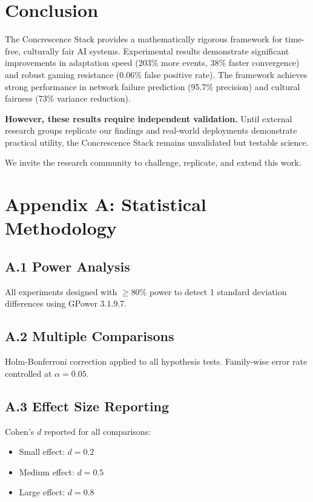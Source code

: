 \documentclass[11pt]{article}
\begin{document}
\section{Conclusion}

The Concrescence Stack provides a mathematically rigorous framework for time-free, culturally fair AI systems. Experimental results demonstrate significant improvements in adaptation speed (203\% more events, 38\% faster convergence) and robust gaming resistance (0.06\% false positive rate). The framework achieves strong performance in network failure prediction (95.7\% precision) and cultural fairness (73\% variance reduction).

\textbf{However, these results require independent validation.} Until external research groups replicate our findings and real-world deployments demonstrate practical utility, the Concrescence Stack remains unvalidated but testable science.

We invite the research community to challenge, replicate, and extend this work.

\appendix
\section*{Appendix A: Statistical Methodology}

\subsection*{A.1 Power Analysis}
All experiments designed with $\geq$80\% power to detect 1 standard deviation differences using GPower 3.1.9.7.

\subsection*{A.2 Multiple Comparisons}
Holm-Bonferroni correction applied to all hypothesis tests. Family-wise error rate controlled at $\alpha = 0.05$.

\subsection*{A.3 Effect Size Reporting}
Cohen's $d$ reported for all comparisons:
\begin{itemize}
    \item Small effect: $d = 0.2$
    \item Medium effect: $d = 0.5$
    \item Large effect: $d = 0.8$
\end{itemize}
\end{document}
